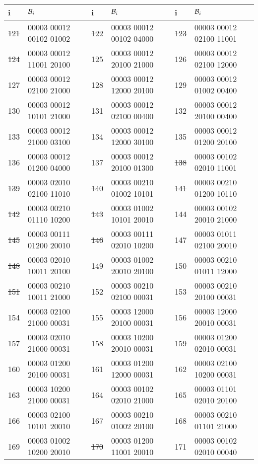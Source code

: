 \begin{tabular}{|l|l||l|l||l|l|}
\hline
 i & $\mathcal{B}_i$  &  i & $\mathcal{B}_i$  &  i & $\mathcal{B}_i$ \\\hline
\hline
\sout{121} &00003 00012 00102 01002 &
\sout{122} &00003 00012 00102 04000 &
\sout{123} &00003 00012 02100 11001 \\
\sout{124} &00003 00012 11001 20100 &
{125} &00003 00012 20100 21000 &
{126} &00003 00012 02100 12000 \\
{127} &00003 00012 02100 21000 &
{128} &00003 00012 12000 20100 &
{129} &00003 00012 01002 00400 \\
{130} &00003 00012 10101 21000 &
{131} &00003 00012 02100 00400 &
{132} &00003 00012 20100 00400 \\
{133} &00003 00012 21000 03100 &
{134} &00003 00012 12000 30100 &
{135} &00003 00012 01200 20100 \\
{136} &00003 00012 01200 04000 &
{137} &00003 00012 20100 01300 &
\sout{138} &00003 00102 02010 11001 \\
\sout{139} &00003 02010 02100 11010 &
\sout{140} &00003 00210 01002 10101 &
\sout{141} &00003 00210 01200 10110 \\
\sout{142} &00003 00210 01110 10200 &
\sout{143} &00003 01002 10101 20010 &
{144} &00003 00102 20010 21000 \\
\sout{145} &00003 00111 01200 20010 &
\sout{146} &00003 00111 02010 10200 &
{147} &00003 01011 02100 20010 \\
\sout{148} &00003 02010 10011 20100 &
{149} &00003 01002 20010 20100 &
{150} &00003 00210 01011 12000 \\
\sout{151} &00003 00210 10011 21000 &
{152} &00003 00210 02100 00031 &
{153} &00003 00210 20100 00031 \\
{154} &00003 02100 21000 00031 &
{155} &00003 12000 20100 00031 &
{156} &00003 12000 20010 00031 \\
{157} &00003 02010 21000 00031 &
{158} &00003 10200 20010 00031 &
{159} &00003 01200 02010 00031 \\
{160} &00003 01200 20100 00031 &
{161} &00003 01200 12000 00031 &
{162} &00003 02100 10200 00031 \\
{163} &00003 10200 21000 00031 &
{164} &00003 00102 02010 21000 &
{165} &00003 01101 02010 20100 \\
{166} &00003 02100 10101 20010 &
{167} &00003 00210 01002 20100 &
{168} &00003 00210 01101 21000 \\
{169} &00003 01002 10200 20010 &
\sout{170} &00003 01200 11001 20010 &
{171} &00003 00102 02010 00040 \\

\end{tabular}
